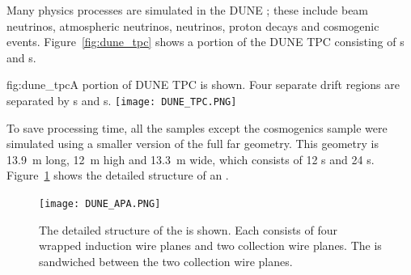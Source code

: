 


Many physics processes are simulated in the DUNE ; these include beam neutrinos, atmospheric neutrinos,  neutrinos, proton decays and cosmogenic events. Figure~\ref{fig:dune_tpc} shows a portion of the DUNE \single TPC consisting of s and s.

\begin{dunefigure}{fig:dune_tpc}{A portion of DUNE \single TPC is shown. Four separate drift regions are separated by s and s.}
\texttt{[image: DUNE\_TPC.PNG]}
\end{dunefigure}

To save processing time, all the  samples except the cosmogenics sample were simulated using a smaller version of the full \nominalmodsize far  geometry. This geometry is \SI{13.9}{m} long, \SI{12}{m} high and \SI{13.3}{m} wide, which consists of 12 s and 24 s. %
Figure~\ref{fig:dune_apa} shows the detailed structure of an . %

\begin{figure}[!ht]
\centering
\texttt{[image: DUNE\_APA.PNG]}
\caption{The detailed structure of the  is shown. Each  consists of four wrapped induction wire planes and two collection wire planes.
The  is sandwiched between the two collection wire planes.}
\label{fig:dune_apa}
\end{figure}

